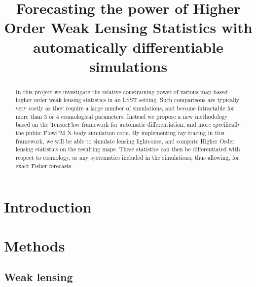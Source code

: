 \documentclass[twocolumn,twocolappendix]{aastex63}
\begin{document}
\title{Forecasting the power of Higher Order Weak Lensing Statistics with automatically differentiable simulations}


\begin{abstract}
In this project we investigate the relative constraining power of various map-based higher order weak lensing statistics in an LSST setting. Such comparisons are typically very costly as they require a large number of simulations, and become intractable for more than 3 or 4 cosmological parameters. Instead we propose a new methodology based on the TensorFlow framework for automatic differentiation, and more specifically the public FlowPM N-body simulation code. By implementing ray-tracing in this framework, we will be able to simulate lensing lightcones, and compute Higher Order lensing statistics on the resulting maps. These statistics can then be differentiated with respect to cosmology, or any systematics included in the simulations, thus allowing, for exact Fisher forecasts.
\end{abstract}





\section{Introduction}


\section{Methods}



\subsection{{Weak lensing}}
\end{document}

